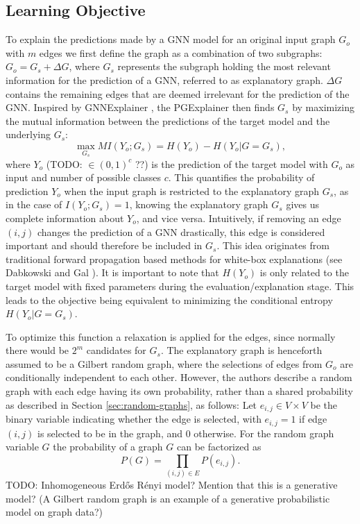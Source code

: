 \subsection{Learning Objective}
\label{sec:learning_objective}
To explain the predictions made by a GNN model for an original input graph $G_o$ with $m$ edges we first define the graph as a combination of two subgraphs: $G_o = G_s + \Delta G$, where $G_s$ represents the subgraph holding the most relevant information for the prediction of a GNN, referred to as explanatory graph. $\Delta G$ contains the remaining edges that are deemed irrelevant for the prediction of the GNN. Inspired by GNNExplainer \cite{ying2019gnnexplainer}, the PGExplainer then finds $G_s$ by maximizing the mutual information between the predictions of the target model and the underlying $G_s$:
\begin{equation}
    \max_{G_s} MI(Y_o;G_s) = H(Y_o) - H(Y_o|G=G_s),
\end{equation} 
where $Y_o$ (TODO: $\in (0,1)^c$ ??) is the prediction of the target model with $G_o$ as input and number of possible classes $c$. This quantifies the probability of prediction $Y_o$ when the input graph is restricted to the explanatory graph $G_s$, as in the case of $I(Y_o;G_s) = 1$, knowing the explanatory graph $G_s$ gives us complete information about $Y_o$, and vice versa. Intuitively, if removing an edge $(i,j)$ changes the prediction of a GNN drastically, this edge is considered important and should therefore be included in $G_s$. This idea originates from traditional forward propagation based methods for white-box explanations (see Dabkowski and Gal \cite{dabkowski2017real}).
It is important to note that $H(Y_o)$ is only related to the target model with fixed parameters during the evaluation/explanation stage. This leads to the objective being equivalent to minimizing the conditional entropy $H(Y_o|G=G_s)$.

To optimize this function a relaxation is applied for the edges, since normally there would be $2^m$ candidates for $G_s$. The explanatory graph is henceforth assumed to be a Gilbert random graph, where the selections of edges from $G_o$ are conditionally independent to each other. However, the authors describe a random graph with each edge having its own probability, rather than a shared probability as described in Section \ref{sec:random-graphs}, as follows: Let $e_{i,j}\in V \times V$ be the binary variable indicating whether the edge is selected, with $e_{i,j} = 1$ if edge $(i,j)$ is selected to be in the graph, and 0 otherwise. For the random graph variable $G$ the probability of a graph $G$ can be factorized as 
\begin{equation}
    P(G) = \prod_{(i,j)\in E}P(e_{i,j}).
\end{equation}
TODO: Inhomogeneous Erdős Rényi model? Mention that this is a generative model? (A Gilbert random graph is an example of a generative probabilistic model on graph data?)

